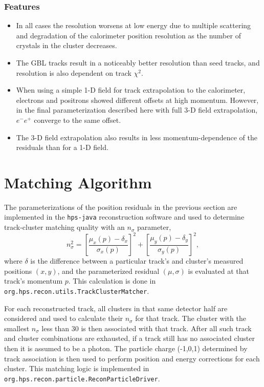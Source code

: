 \documentclass[amsmath,amssymb,notitlepage,12pt]{revtex4-1}
\begin{document}
\subsubsection{Features}
\begin{itemize}
    \item In all cases the resolution worsens at low energy due to multiple scattering and degradation of the calorimeter position resolution as the number of crystals in the cluster decreases.
    \item The GBL tracks result in a noticeably better resolution than seed tracks, and resolution is also dependent on track $\chi^2$.
    \item When using a simple 1-D field for track extrapolation to the calorimeter, electrons and positrons showed different offsets at high momentum.  However, in the final parameterization described here with full 3-D field extrapolation, $e^-e^+$  converge to the same offset.  
    \item The 3-D field extrapolation also results in less momentum-dependence of the residuals than for a 1-D field.
\end{itemize}

\section{Matching Algorithm}
The parameterizations of the position residuals in the previous section are implemented in the \texttt{hps-java} reconstruction software and used to determine track-cluster matching quality with an $n_\sigma$ parameter,
\begin{equation}
    n_\sigma^2 = \left[\frac{\mu_x(p)-\delta_x}{\sigma_x(p)}\right]^2 + \left[\frac{\mu_y(p)-\delta_y}{\sigma_y(p)}\right]^2,
    \label{eq:nsigma}
\end{equation}
where $\delta$ is the difference between a particular track's and cluster's measured positions $(x,y)$, and the parameterized residual $(\mu,\sigma)$ is evaluated at that track's momentum $p$.  This calculation is done in \texttt{org.hps.recon.utils.TrackClusterMatcher}.

For each reconstructed track, all clusters in that same detector half are considered and used to calculate their $n_\sigma$ for that track.  The cluster with the smallest $n_\sigma$ less than 30 is then associated with that track.  After all such track and cluster combinations are exhausted, if a track still has no associated cluster then it is assumed to be a photon.  
The particle charge (-1,0,1) determined by track association is then used to perform position and energy corrections for each cluster.  This matching logic is implemented in \texttt{org.hps.recon.particle.ReconParticleDriver}.
 
\end{document}
